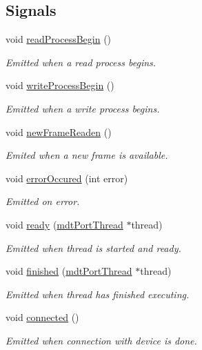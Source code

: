 \subsection*{Signals}
\begin{DoxyCompactItemize}
\item 
void \hyperlink{classmdt_port_thread_abb7234a12814f5c7c98bd6c1c2ccb776}{read\-Process\-Begin} ()
\begin{DoxyCompactList}\small\item\em Emitted when a read process begins. \end{DoxyCompactList}\item 
void \hyperlink{classmdt_port_thread_aa01aac7e1a26deb823be40e6cb01b255}{write\-Process\-Begin} ()
\begin{DoxyCompactList}\small\item\em Emitted when a write process begins. \end{DoxyCompactList}\item 
void \hyperlink{classmdt_port_thread_a7fc2245c753fd65e1beffec211c41461}{new\-Frame\-Readen} ()
\begin{DoxyCompactList}\small\item\em Emited when a new frame is available. \end{DoxyCompactList}\item 
void \hyperlink{classmdt_port_thread_ab31cbe1a85aa830cd368654d1f806326}{error\-Occured} (int error)
\begin{DoxyCompactList}\small\item\em Emitted on error. \end{DoxyCompactList}\item 
void \hyperlink{classmdt_port_thread_ae71ae3aa58eb1f409a2b128e6ef3148b}{ready} (\hyperlink{classmdt_port_thread}{mdt\-Port\-Thread} $\ast$thread)
\begin{DoxyCompactList}\small\item\em Emitted when thread is started and ready. \end{DoxyCompactList}\item 
void \hyperlink{classmdt_port_thread_a4266192826f09d8186ee8f9b646ac089}{finished} (\hyperlink{classmdt_port_thread}{mdt\-Port\-Thread} $\ast$thread)
\begin{DoxyCompactList}\small\item\em Emitted when thread has finished executing. \end{DoxyCompactList}\item 
void \hyperlink{classmdt_port_thread_a88070ed43976a83b6e4d289d6f1827bd}{connected} ()
\begin{DoxyCompactList}\small\item\em Emitted when connection with device is done. \end{DoxyCompactList}\end{DoxyCompactItemize}
